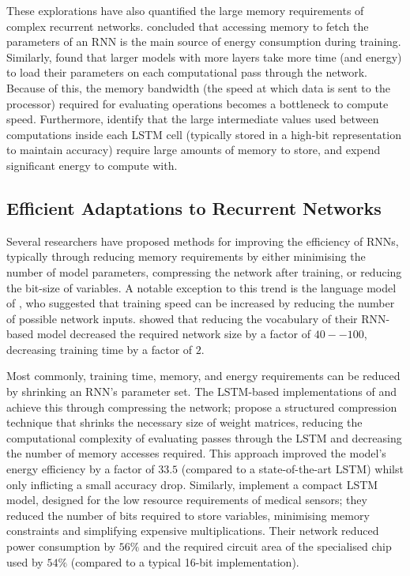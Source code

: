 \documentclass[a4paper, 11pt]{report}
\begin{document}
    These explorations have also quantified the large memory requirements of complex recurrent networks. \citet{feliz-2021} concluded that accessing memory to fetch the parameters of an RNN is the main source of energy consumption during training. Similarly, \citet{cao-2017} found that larger models with more layers take more time (and energy) to load their parameters on each computational pass through the network. Because of this, the memory bandwidth (the speed at which data is sent to the processor) required for evaluating operations becomes a bottleneck to compute speed. Furthermore, \citet{zhang-2021} identify that the large intermediate values used between computations inside each LSTM cell (typically stored in a high-bit representation to maintain accuracy) require large amounts of memory to store, and expend significant energy to compute with.


    \subsection{Efficient Adaptations to Recurrent Networks}

    Several researchers have proposed methods for improving the efficiency of RNNs, typically through reducing memory requirements by either minimising the number of model parameters, compressing the network after training, or reducing the bit-size of variables. A notable exception to this trend is the language model of \citet{li-2016}, who suggested that training speed can be increased by reducing the number of possible network inputs. \citet{li-2016} showed that reducing the vocabulary of their RNN-based model decreased the required network size by a factor of $40--100$, decreasing training time by a factor of $2$. 

    Most commonly, training time, memory, and energy requirements can be reduced by shrinking an RNN's parameter set. The LSTM-based implementations of \citet{wang-2018} and \citet{chen-2022} achieve this through compressing the network; \citet{wang-2018} propose a structured compression technique that shrinks the necessary size of weight matrices, reducing the computational complexity of evaluating passes through the LSTM and decreasing the number of memory accesses required. This approach improved the model's energy efficiency by a factor of $33.5$ (compared to a state-of-the-art LSTM) whilst only inflicting a small accuracy drop. Similarly, \citet{chen-2022} implement a compact LSTM model, designed for the low resource requirements of medical sensors; they reduced the number of bits required to store variables, minimising memory constraints and simplifying expensive multiplications. Their network reduced power consumption by $56\%$ and the required circuit area of the specialised chip used by $54\%$ (compared to a typical 16-bit implementation).
\end{document}
